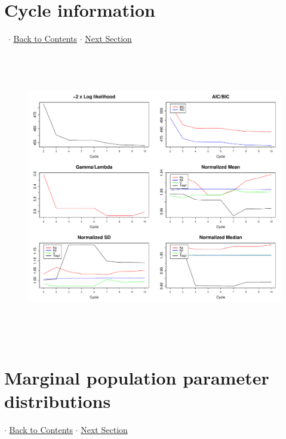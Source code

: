 \documentclass{article}
\begin{document}
            \section{Cycle information} \  
 $\cdot$ \hyperlink{tableofcontents}{Back to Contents} $\cdot$ \hyperlink{mppd}{Next Section} \newline 
\begin{figure}[H] 
            \includegraphics[height=4.99in,width=7in]{cycle.pdf}
            \end{figure} 
\hypertarget{mppd}{}
          \section{Marginal population parameter distributions} 
 $\cdot$ \hyperlink{tableofcontents}{Back to Contents} $\cdot$ \hyperlink{suppoint}{Next Section} \newline
           
\end{document}
